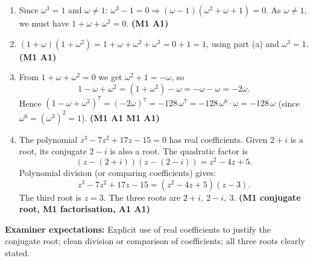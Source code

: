 \documentclass[11pt]{article}
\begin{document}
\begin{corrige}
\begin{enumerate}
\item Since $\omega^3 = 1$ and $\omega \neq 1$: $\omega^3 - 1 = 0 \Rightarrow (\omega - 1)(\omega^2 + \omega + 1) = 0$. As $\omega \neq 1$, we must have $1 + \omega + \omega^2 = 0$. \hfill \textbf{(M1 A1)}
\item $(1+\omega)(1+\omega^2) = 1 + \omega + \omega^2 + \omega^3 = 0 + 1 = 1$, using part (a) and $\omega^3 = 1$. \hfill \textbf{(M1 A1)}
\item From $1 + \omega + \omega^2 = 0$ we get $\omega^2 + 1 = -\omega$, so
\[ 1 - \omega + \omega^2 = (1 + \omega^2) - \omega = -\omega - \omega = -2\omega. \]
Hence $(1 - \omega + \omega^2)^7 = (-2\omega)^7 = -128\,\omega^7 = -128\,\omega^{6}\cdot\omega = -128\,\omega$ (since $\omega^6 = (\omega^3)^2 = 1$). \hfill \textbf{(M1 A1 M1 A1)}
\item The polynomial $z^3 - 7z^2 + 17z - 15 = 0$ has real coefficients. Given $2+i$ is a root, its conjugate $2-i$ is also a root. The quadratic factor is
\[ (z - (2+i))(z - (2-i)) = z^2 - 4z + 5. \]
Polynomial division (or comparing coefficients) gives:
\[ z^3 - 7z^2 + 17z - 15 = (z^2 - 4z + 5)(z - 3). \]
The third root is $z = 3$. The three roots are $2 + i,\ 2 - i,\ 3$. \hfill \textbf{(M1 conjugate root, M1 factorisation, A1 A1)}
\end{enumerate}
\textbf{Examiner expectations:} Explicit use of real coefficients to justify the conjugate root; clean division or comparison of coefficients; all three roots clearly stated.
\end{corrige}
\end{document}
